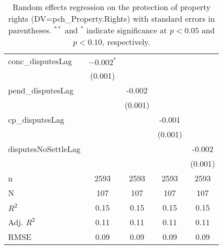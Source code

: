 \begin{table}[ht]
\begin{tabular}{lcccc}
  conc\_disputesLag & $-0.002^{\ast}$ &  &  &  \\ 
   & (0.001) &  &  &  \\ 
  pend\_disputesLag &  & -0.002 &  &  \\ 
   &  & (0.001) &  &  \\ 
  cp\_disputesLag &  &  & -0.001 &  \\ 
   &  &  & (0.001) &  \\ 
  disputesNoSettleLag &  &  &  & -0.002 \\ 
   &  &  &  & (0.001) \\ 
   \hline
n & 2593 & 2593 & 2593 & 2593 \\ 
  N & 107 & 107 & 107 & 107 \\ 
  $R^{2}$ & 0.15 & 0.15 & 0.15 & 0.15 \\ 
  Adj. $R^{2}$ & 0.11 & 0.11 & 0.11 & 0.11 \\ 
  RMSE & 0.09 & 0.09 & 0.09 & 0.09 \\ 
   \hline
\hline
\end{tabular}
\caption{Random effects regression on the protection of property rights (DV=pch\_Property.Rights) with standard errors in parentheses. $^{**}$ and $^{*}$ indicate significance at $p< 0.05 $ and $p< 0.10 $, respectively.} 
\end{table}
